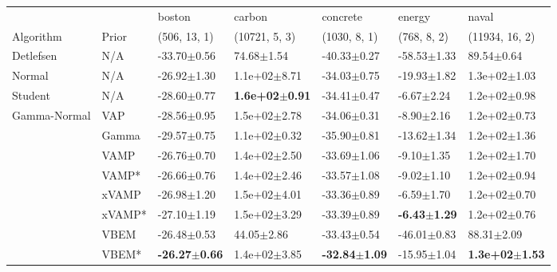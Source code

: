 \begin{tabular}{lllllll}
\toprule
             &       &                    boston &                     carbon &                  concrete &                   energy &                      naval \\
Algorithm & Prior& (506, 13, 1)& (10721, 5, 3)& (1030, 8, 1)& (768, 8, 2)& (11934, 16, 2)\\
\midrule
Detlefsen & N/A &           -33.70$\pm$0.56 &             74.68$\pm$1.54 &           -40.33$\pm$0.27 &          -58.53$\pm$1.33 &             89.54$\pm$0.64 \\
Normal & N/A &           -26.92$\pm$1.30 &           1.1e+02$\pm$8.71 &           -34.03$\pm$0.75 &          -19.93$\pm$1.82 &           1.3e+02$\pm$1.03 \\
Student & N/A &           -28.60$\pm$0.77 &  \textbf{1.6e+02$\pm$0.91} &           -34.41$\pm$0.47 &           -6.67$\pm$2.24 &           1.2e+02$\pm$0.98 \\
Gamma-Normal & VAP &           -28.56$\pm$0.95 &           1.5e+02$\pm$2.78 &           -34.06$\pm$0.31 &           -8.90$\pm$2.16 &           1.2e+02$\pm$0.73 \\
             & Gamma &           -29.57$\pm$0.75 &           1.1e+02$\pm$0.32 &           -35.90$\pm$0.81 &          -13.62$\pm$1.34 &           1.2e+02$\pm$1.36 \\
             & VAMP &           -26.76$\pm$0.70 &           1.4e+02$\pm$2.50 &           -33.69$\pm$1.06 &           -9.10$\pm$1.35 &           1.2e+02$\pm$1.70 \\
             & VAMP* &           -26.66$\pm$0.76 &           1.4e+02$\pm$2.46 &           -33.57$\pm$1.08 &           -9.02$\pm$1.10 &           1.2e+02$\pm$0.94 \\
             & xVAMP &           -26.98$\pm$1.20 &           1.5e+02$\pm$4.01 &           -33.36$\pm$0.89 &           -6.59$\pm$1.70 &           1.2e+02$\pm$0.70 \\
             & xVAMP* &           -27.10$\pm$1.19 &           1.5e+02$\pm$3.29 &           -33.39$\pm$0.89 &  \textbf{-6.43$\pm$1.29} &           1.2e+02$\pm$0.76 \\
             & VBEM &           -26.48$\pm$0.53 &             44.05$\pm$2.86 &           -33.43$\pm$0.54 &          -46.01$\pm$0.83 &             88.31$\pm$2.09 \\
             & VBEM* &  \textbf{-26.27$\pm$0.66} &           1.4e+02$\pm$3.85 &  \textbf{-32.84$\pm$1.09} &          -15.95$\pm$1.04 &  \textbf{1.3e+02$\pm$1.53} \\

\end{tabular}
